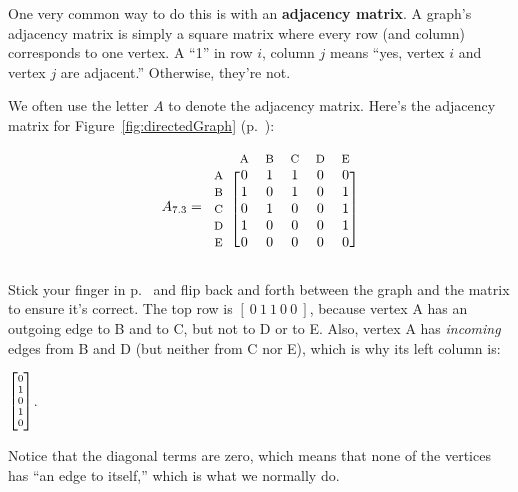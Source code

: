 \begin{alttitles}

One very common way to do this is with an \textbf{adjacency matrix}. A graph's
adjacency matrix is simply a square matrix where every row (and column)
corresponds to one vertex. A ``1'' in row $i$, column $j$ means ``yes, vertex
$i$ and vertex $j$ are adjacent.'' Otherwise, they're not.

We often use the letter $A$ to denote the adjacency matrix. Here's the
adjacency matrix for Figure~\ref{fig:directedGraph}
(p.~\pageref{fig:directedGraph}):

\label{firstAdjacencyMatrix}
\[
A_{7.3} = 
\begin{blockarray}{cccccc}
& {\footnotesize\textrm{A}} & {\footnotesize\textrm{B}} & {\footnotesize\textrm{C}} & {\footnotesize\textrm{D}} & {\footnotesize\textrm{E}} \\
\begin{block}{c[ccccc]}
{\footnotesize\textrm{A}} & 0 & 1 & 1 & 0 & 0 \\
{\footnotesize\textrm{B}} & 1 & 0 & 1 & 0 & 1 \\
{\footnotesize\textrm{C}} & 0 & 1 & 0 & 0 & 1 \\
{\footnotesize\textrm{D}} & 1 & 0 & 0 & 0 & 1 \\
{\footnotesize\textrm{E}} & 0 & 0 & 0 & 0 & 0 \\
\end{block}
\end{blockarray}
\]

Stick your finger in p.~\pageref{fig:directedGraph} and flip back and forth
between the graph and the matrix to ensure it's correct. The top row is $[\ 0\
1\ 1\ 0\ 0\ ]$, because vertex A has an outgoing edge to B and to C, but not to
D or to E. Also, vertex A has \textit{incoming} edges from B and D (but neither
from C nor E), which is why its left column is:

\vspace{-.15in}
\begin{center}
${\scriptsize \begin{bmatrix} 0
\\ 1 \\ 0 \\ 1 \\ 0 \end{bmatrix}}$.
\end{center}

Notice that the diagonal terms are zero, which means that none of the vertices
has ``an edge to itself,'' which is what we normally do.


\end{alttitles}
